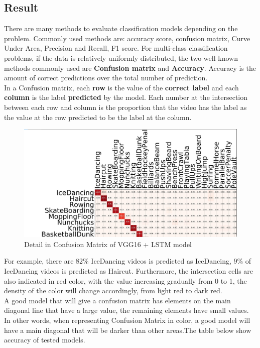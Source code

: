 \subsection{Result}
There are many methods to evaluate classification models depending on the problem. Commonly used methods are: accuracy score, confusion matrix, Curve Under Area, Precision and Recall, F1 score. For multi-class classification problems, if the data is relatively uniformly distributed, the two well-known methods commonly used are \textbf{Confusion matrix} and \textbf{Accuracy}. 
Accuracy is the amount of correct predictions over the total number of prediction.\\
In a Confusion matrix, each \textbf{row} is the value of the \textbf{correct label} and each \textbf{column} is the label \textbf{predicted} by the model. Each number at the intersection between each row and column is the proportion that the video has the label as the value at the row predicted to be the label at the column.\\
\begin{center}
	\begin{figure}[H]
		\centering
		\includegraphics[width=1\columnwidth]{images/chap3/CFM-zoom.png}
		\caption{Detail in Confusion Matrix of VGG16 + LSTM model}
		\label{chap3:cfm-zoom}
	\end{figure}
\end{center}
\vspace{-1cm}
For example, there are 82\% IceDancing videos is predicted as IceDancing, 9\% of IceDancing videos is predicted as Haircut.
Furthermore, the intersection cells are also indicated in red color, with the value increasing gradually from 0 to 1, the density of the color will change accordingly, from light red to dark red.\\
A good model that will give a confusion matrix has elements on the main diagonal line that have a large value, the remaining elements have small values. In other words, when representing Confusion Matrix in color, a good model will have a main diagonal that will be darker than other areas.The table below show accuracy of tested models.
